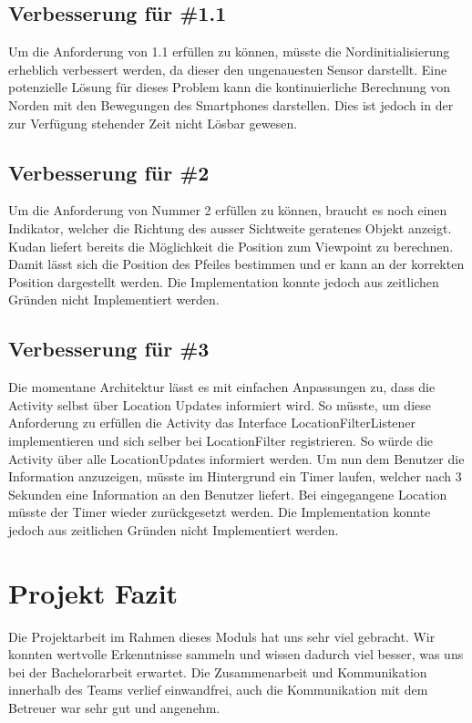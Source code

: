 \documentclass[a4paper]{scrreprt}
\begin{document}
\subsection{Verbesserung für \#1.1}
Um die Anforderung von 1.1 erfüllen zu können, müsste die Nordinitialisierung erheblich verbessert werden, da dieser den ungenauesten Sensor darstellt. Eine potenzielle Lösung für dieses Problem kann die kontinuierliche Berechnung von Norden mit den Bewegungen des Smartphones darstellen. Dies ist jedoch in der zur Verfügung stehender Zeit nicht Lösbar gewesen.

\subsection{Verbesserung für \#2}
Um die Anforderung von Nummer 2 erfüllen zu können, braucht es noch einen Indikator, welcher die Richtung des ausser Sichtweite geratenes Objekt anzeigt. Kudan liefert bereits die Möglichkeit die Position zum Viewpoint zu berechnen. Damit lässt sich die Position des Pfeiles bestimmen und er kann an der korrekten Position dargestellt werden. Die Implementation konnte jedoch aus zeitlichen Gründen nicht Implementiert werden.

\subsection{Verbesserung für \#3}
Die momentane Architektur lässt es mit einfachen Anpassungen zu, dass die Activity selbst über Location Updates informiert wird. So müsste, um diese Anforderung zu erfüllen die Activity das Interface LocationFilterListener implementieren und sich selber bei LocationFilter registrieren. So würde die Activity über alle LocationUpdates informiert werden. Um nun dem Benutzer die Information anzuzeigen, müsste im Hintergrund ein Timer laufen, welcher nach 3 Sekunden eine Information an den Benutzer liefert. Bei eingegangene Location müsste der Timer wieder zurückgesetzt werden.
Die Implementation konnte jedoch aus zeitlichen Gründen nicht Implementiert werden.

\section{Projekt Fazit}
Die Projektarbeit im Rahmen dieses Moduls hat uns sehr viel gebracht. Wir konnten wertvolle Erkenntnisse sammeln und wissen dadurch viel besser, was uns bei der Bachelorarbeit erwartet. Die Zusammenarbeit und Kommunikation innerhalb des Teams verlief einwandfrei, auch die Kommunikation mit dem Betreuer war sehr gut und angenehm.
\end{document}
